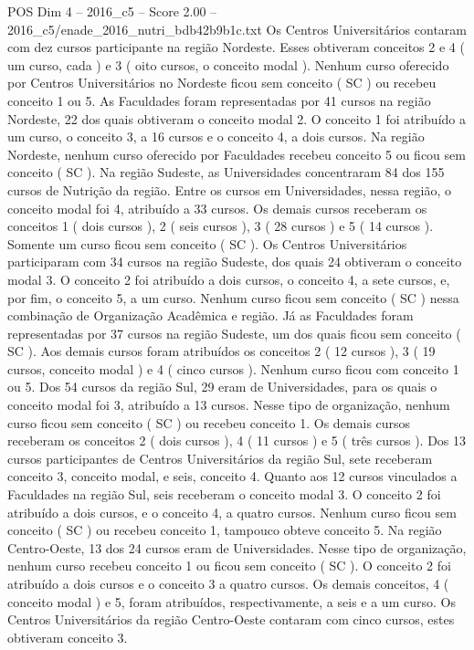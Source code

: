 \begin{textsample}{POS Dim 4 – 2016\_c5 – Score 2.00 – 2016\_c5/enade\_2016\_nutri\_bdb42b9b1c.txt}
Os Centros Universitários contaram com dez cursos participante na região Nordeste.
Esses obtiveram conceitos 2 e 4 ( um curso, cada ) e 3 ( oito cursos, o conceito modal ).
Nenhum curso oferecido por Centros Universitários no Nordeste ficou sem conceito ( SC ) ou recebeu conceito 1 ou 5.
As Faculdades foram representadas por 41 cursos na região Nordeste, 22 dos quais obtiveram o conceito modal 2.
O conceito 1 foi atribuído a um curso, o conceito 3, a 16 cursos e o conceito 4, a dois cursos.
Na região Nordeste, nenhum curso oferecido por Faculdades recebeu conceito 5 ou ficou sem conceito ( SC ).
Na região Sudeste, as Universidades concentraram 84 dos 155 cursos de Nutrição da região.
Entre os cursos em Universidades, nessa região, o conceito modal foi 4, atribuído a 33 cursos.
Os demais cursos receberam os conceitos 1 ( dois cursos ), 2 ( seis cursos ), 3 ( 28 cursos ) e 5 ( 14 cursos ).
Somente um curso ficou sem conceito ( SC ).
Os Centros Universitários participaram com 34 cursos na região Sudeste, dos quais 24 obtiveram o conceito modal 3.
O conceito 2 foi atribuído a dois cursos, o conceito 4, a sete cursos, e, por fim, o conceito 5, a um curso.
Nenhum curso ficou sem conceito ( SC ) nessa combinação de Organização Acadêmica e região.
Já as Faculdades foram representadas por 37 cursos na região Sudeste, um dos quais ficou sem conceito ( SC ).
Aos demais cursos foram atribuídos os conceitos 2 ( 12 cursos ), 3 ( 19 cursos, conceito modal ) e 4 ( cinco cursos ).
Nenhum curso ficou com conceito 1 ou 5.
Dos 54 cursos da região Sul, 29 eram de Universidades, para os quais o conceito modal foi 3, atribuído a 13 cursos.
Nesse tipo de organização, nenhum curso ficou sem conceito ( SC ) ou recebeu conceito 1.
Os demais cursos receberam os conceitos 2 ( dois cursos ), 4 ( 11 cursos ) e 5 ( três cursos ).
Dos 13 cursos participantes de Centros Universitários da região Sul, sete receberam conceito 3, conceito modal, e seis, conceito 4.
Quanto aos 12 cursos vinculados a Faculdades na região Sul, seis receberam o conceito modal 3.
O conceito 2 foi atribuído a dois cursos, e o conceito 4, a quatro cursos.
Nenhum curso ficou sem conceito ( SC ) ou recebeu conceito 1, tampouco obteve conceito 5.
Na região Centro-Oeste, 13 dos 24 cursos eram de Universidades.
Nesse tipo de organização, nenhum curso recebeu conceito 1 ou ficou sem conceito ( SC ).
O conceito 2 foi atribuído a dois cursos e o conceito 3 a quatro cursos.
Os demais conceitos, 4 ( conceito modal ) e 5, foram atribuídos, respectivamente, a seis e a um curso.
Os Centros Universitários da região Centro-Oeste contaram com cinco cursos, estes obtiveram conceito 3.

\end{textsample}
